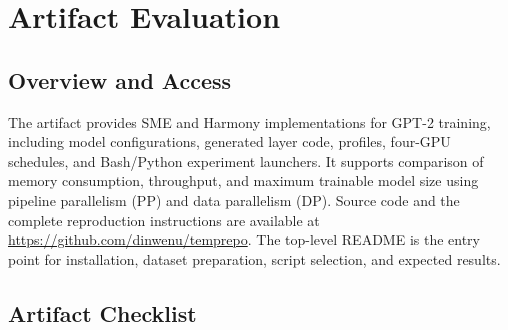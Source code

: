 \section{Artifact Evaluation}
\label{sec:artifact}

\subsection{Overview and Access}

The artifact provides SME and Harmony implementations for GPT-2
training, including model configurations, generated layer code,
profiles, four-GPU schedules, and Bash/Python experiment launchers.
It supports comparison of memory consumption, throughput, and
maximum trainable model size using pipeline parallelism (PP) and
data parallelism (DP). Source code and the complete reproduction
instructions are available at
\url{https://github.com/dinwenu/temprepo}.
The top-level README is the entry point for installation, dataset
preparation, script selection, and expected results.

\subsection{Artifact Checklist}

